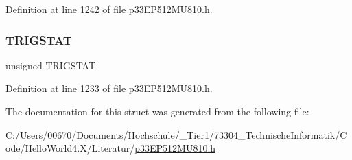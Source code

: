 Definition at line 1242 of file p33\+E\+P512\+M\+U810.\+h.

\mbox{\label{structtag_i_c13_c_o_n2_b_i_t_s_ab379549de54ac93ad4aa73686c34cb7c}} 
\subsubsection{\texorpdfstring{T\+R\+I\+G\+S\+T\+AT}{TRIGSTAT}}
{\footnotesize\ttfamily unsigned T\+R\+I\+G\+S\+T\+AT}



Definition at line 1233 of file p33\+E\+P512\+M\+U810.\+h.



The documentation for this struct was generated from the following file\+:\begin{DoxyCompactItemize}
\item 
C\+:/\+Users/00670/\+Documents/\+Hochschule/\+\_\+\+Tier1/73304\+\_\+\+Technische\+Informatik/\+Code/\+Hello\+World4.\+X/\+Literatur/\hyperlink{p33_e_p512_m_u810_8h}{p33\+E\+P512\+M\+U810.\+h}\end{DoxyCompactItemize}
